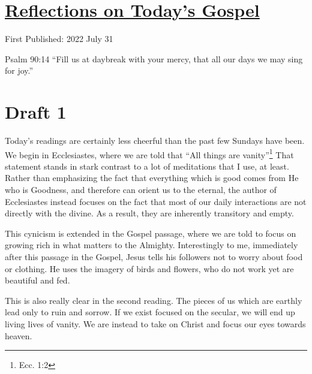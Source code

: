 \documentclass[12pt]{article}[titlepage]
\newcommand{\say}[1]{``#1''}
\newcommand{\1}{\={a}}
\newcommand{\2}{\={e}}
\newcommand{\3}{\={\i}}
\newcommand{\4}{\=o}
\newcommand{\5}{\=u}
\newcommand{\6}{\={A}}
\renewcommand{\,}{\textsuperscript{,}}
\begin{document}
\doublespacing
\section{\href{reflections-on-readings-18-ordinary-c-22.html}{Reflections on Today's Gospel}}
First Published: 2022 July 31

Psalm 90:14 \say{Fill us at daybreak with your mercy, that all our days we may sing for joy.}

\section{Draft 1}
Today's readings are certainly less cheerful than the past few Sundays have been.
We begin in Ecclesiastes, where we are told that \say{All things are vanity}\footnote{Ecc. 1:2}
That statement stands in stark contrast to a lot of meditations that I use, at least.
Rather than emphasizing the fact that everything which is good comes from He who is Goodness, and therefore can orient us to the eternal, the author of Ecclesiastes instead focuses on the fact that most of our daily interactions are not directly with the divine.
As a result, they are inherently transitory and empty.

This cynicism is extended in the Gospel passage, where we are told to focus on growing rich in what matters to the Almighty.
Interestingly to me, immediately after this passage in the Gospel, Jesus tells his followers not to worry about food or clothing.
He uses the imagery of birds and flowers, who do not work yet are beautiful and fed.

This is also really clear in the second reading.
The pieces of us which are earthly lead only to ruin and sorrow.
If we exist focused on the secular, we will end up living lives of vanity.
We are instead to take on Christ and focus our eyes towards heaven.
\end{document}
